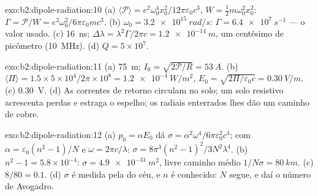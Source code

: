 \begin{solution}{exo:b2:dipole-radiation:10}
(a) $\langle\mathcal P\rangle = e^2\omega_0^4x_0^2/12\pi\varepsilon_0c^3$, $W = \tfrac12m\omega_0^2x_0^2$:
$\Gamma = \mathcal P/W = e^2\omega_0^2/6\pi\varepsilon_0mc^3$. (b) $\omega_0 = \qty{3.2e15}{rad/s}$: $\Gamma =
\qty{6.4e7}{s^{-1}}$ --- o valor usado. (c) \qty{16}{ns}; $\Delta\lambda = \lambda^2\Gamma/2\pi c =
\qty{1.2e-14}{m}$, um centésimo de picômetro (\qty{10}{MHz}). (d) $Q = 5 \times 10^7$.
\end{solution}

\begin{solution}{exo:b2:dipole-radiation:11}
(a) \qty{75}{m}; $I_0 = \sqrt{2\mathcal P/R} = \qty{53}{A}$. (b) $\langle\Pi\rangle = 1.5 \times
5 \times 10^4/2\pi \times 10^8 = \qty{1.2e-4}{W/m^2}$, $E_0 = \sqrt{2\Pi/\varepsilon_0c} = \qty{0.30}{V/m}$.
(c) \qty{0.30}{V}. (d) As correntes de retorno circulam no solo; um solo
resistivo acrescenta perdas e estraga o espelho; os radiais enterrados lhes dão um
caminho de cobre.
\end{solution}

\begin{solution}{exo:b2:dipole-radiation:12}
(a) $p_0 = \alpha E_0$ dá $\sigma = \alpha^2\omega^4/6\pi\varepsilon_0^2c^4$; com $\alpha = \varepsilon_0(n^2
- 1)/N$ e $\omega = 2\pi c/\lambda$: $\sigma = 8\pi^3(n^2 - 1)^2/3N^2\lambda^4$. (b) $n^2 - 1 =
5.8 \times 10^{-4}$: $\sigma = \qty{4.9e-31}{m^2}$, livre caminho médio $1/N\sigma = \qty{80}{km}$. (c)
$8/80 = 0.1$. (d) $\sigma$ é medida pela  do céu, e $n$ é
conhecido: $N$ segue, e daí o número de Avogadro.
\end{solution}

